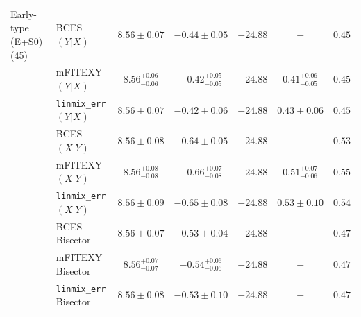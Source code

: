 \documentclass[preprint2]{emulateapj}
\begin{document}
\begin{table}
\begin{tabular}{llccccc}
 Early-type (E+S0) (45) & BCES $(Y|X)$   & $8.56 \pm 0.07$ & $-0.44 \pm 0.05$ & $-24.88$ & $-$ & $0.45$ \\
                        & mFITEXY $(Y|X)$  & $8.56^{+0.06}_{-0.06}$ & $-0.42^{+0.05}_{-0.05}$ & $-24.88$ & $0.41^{+0.06}_{-0.05}$ & $0.45$ \\
                        & {\tt linmix\_err} $(Y|X)$  & $8.56 \pm 0.07$ & $-0.42 \pm 0.06$ & $-24.88$ & $0.43 \pm 0.06$ & $0.45$ \\ [0.5em]
                        & BCES $(X|Y)$   & $8.56 \pm 0.08$ & $-0.64 \pm 0.05$ & $-24.88$ & $-$ & $0.53$ \\
                        & mFITEXY $(X|Y)$  & $8.56^{+0.08}_{-0.08}$ & $-0.66^{+0.07}_{-0.08}$ & $-24.88$ & $0.51^{+0.07}_{-0.06}$ & $0.55$ \\
                        & {\tt linmix\_err} $(X|Y)$  & $8.56 \pm 0.09$ & $-0.65 \pm 0.08$ & $-24.88$ & $0.53 \pm 0.10$ & $0.54$ \\ [0.5em]
                        & BCES Bisector  & $8.56 \pm 0.07$ & $-0.53 \pm 0.04$ & $-24.88$ & $-$ & $0.47$ \\
                        & mFITEXY Bisector & $8.56^{+0.07}_{-0.07}$ & $-0.54^{+0.06}_{-0.06}$ & $-24.88$ & $-$    & $0.47$ \\
                        & {\tt linmix\_err} Bisector & $8.56 \pm 0.08$ & $-0.53 \pm 0.10$ & $-24.88$ & $-$    & $0.47$ \\ [0.5em]



\end{tabular}
\end{table}
\end{document}
